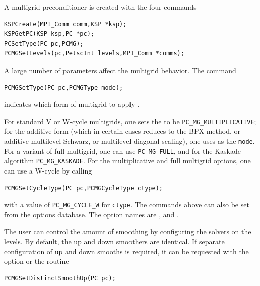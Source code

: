 A multigrid preconditioner is created with the four commands
\begin{lstlisting}
KSPCreate(MPI_Comm comm,KSP *ksp);
KSPGetPC(KSP ksp,PC *pc);
PCSetType(PC pc,PCMG);
PCMGSetLevels(pc,PetscInt levels,MPI_Comm *comms);
\end{lstlisting}
A large number of parameters affect the multigrid behavior. The command
\begin{lstlisting}
PCMGSetType(PC pc,PCMGType mode);
\end{lstlisting}
indicates which form of multigrid to apply \cite{1sbg}.
  

For standard V or W-cycle multigrids, one sets the 
 to be  \lstinline{PC_MG_MULTIPLICATIVE}; for the
additive form (which in certain cases reduces to the BPX method, or additive
multilevel Schwarz, or multilevel diagonal scaling), one uses
  as the \lstinline{mode}.  For a variant
of full multigrid, one can
 use  \lstinline{PC_MG_FULL}, and for the Kaskade
algorithm  \lstinline{PC_MG_KASKADE}.
For the multiplicative and full multigrid options, one can use a
W-cycle by   calling
\begin{lstlisting}
PCMGSetCycleType(PC pc,PCMGCycleType ctype);
\end{lstlisting}
with a value of \lstinline{PC_MG_CYCLE_W} for \lstinline{ctype}.
The commands above can also be set from the options database. The option
names are ,
and  .  

The user can control the amount of smoothing
  by configuring the solvers on
the levels.  By default, the up and down smoothers are identical.  If
separate configuration of up and down smooths is required, it can be
requested with the option 
 or the routine
\begin{lstlisting}
PCMGSetDistinctSmoothUp(PC pc);
\end{lstlisting}

